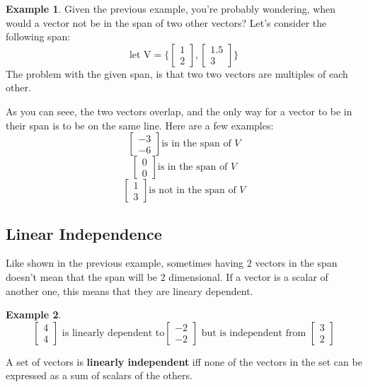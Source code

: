 \documentclass[table]{article}
\theoremstyle{definition}
\newtheorem{ex}{Example}[section]
\begin{document}
  \begin{ex}
    Given the previous example, you're probably wondering, when would a vector not be in the span of two other vectors? Let's consider the following span:
    \[\text{let V} = \{
      \begin{bmatrix}
        1 \\ 2
      \end{bmatrix}
      ,
      \begin{bmatrix}
        1.5 \\ 3
      \end{bmatrix}
    \}\]
    The problem with the given span, is that two two vectors are multiples of each other.  
    \begin{center}
  \end{center}

  As you can seee, the two vectors overlap, and the only way for a vector to be in their span is to be on the same line. Here are a few examples: 
  \[ \begin{bmatrix}
    -3 \\ -6
  \end{bmatrix} \text{is in the span of } V\]
  \[ \begin{bmatrix}
    0 \\ 0
  \end{bmatrix} \text{is in the span of } V\]
  \[ \begin{bmatrix}
    1 \\ 3
  \end{bmatrix} \text{is not in the span of } V\]
  \end{ex}
  \subsection{Linear Independence}
  Like shown in the previous example, sometimes having 2 vectors in the span doesn't mean that the span will be 2 dimensional. If a vector is a scalar of another one, this means that they are lineary dependent.
  \begin{ex}
    \[
    \begin{bmatrix}
      4 \\ 4
    \end{bmatrix}
    \text{ is linearly dependent to}
    \begin{bmatrix}
      -2 \\ -2
    \end{bmatrix}
    \text{ but is independent from }
    \begin{bmatrix}
      3 \\ 2
    \end{bmatrix}
    \]
  \end{ex}
  A set of vectors is \textbf{linearly independent} iff none of the vectors in the set can be expressed as a sum of scalars of the others.
\end{document}

